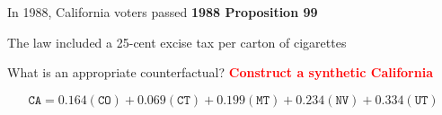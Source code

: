 \documentclass[notes,11pt, aspectratio=169]{beamer}
\newenvironment{wideitemize}{\itemize\addtolength{\itemsep}{10pt}}{\enditemize}
\begin{document}
\begin{frame}{}

    \begin{wideitemize}
        \item In 1988, California voters passed \textbf{1988 Proposition 99}
        \item The law included a 25-cent excise tax per carton of cigarettes
        \item What is an appropriate counterfactual? \pause \textcolor{red}{\textbf{Construct a synthetic California}} \pause 

    \end{wideitemize}
    \medskip \medskip \medskip \medskip
    \[\texttt{CA} = 0.164 (\texttt{CO}) + 0.069 (\texttt{CT}) + 0.199 (\texttt{MT}) + 0.234 (\texttt{NV}) + 0.334 (\texttt{UT})\]
\end{frame}
\end{document}
